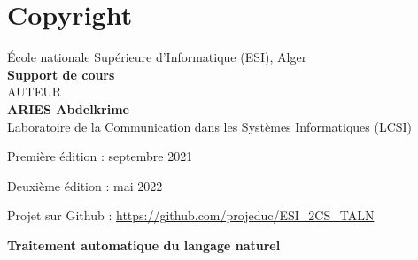 \documentclass{KBook}
\begin{document}
\fi



\chapter*{Copyright}

\begin{center}
	École nationale Supérieure d'Informatique (ESI), Alger \\
	\textbf{Support de cours} \\[1cm]
	{\Large AUTEUR}\\[.5cm]
	{\LARGE\bfseries ARIES Abdelkrime}\\
	Laboratoire de la Communication dans les Systèmes Informatiques (LCSI)
\end{center}

Première édition : septembre 2021

Deuxième édition : mai 2022

Projet sur Github : \url{https://github.com/projeduc/ESI_2CS_TALN}


\begin{center}
	{\Huge \textbf{Traitement automatique du langage naturel}}
\end{center}
\end{document}
